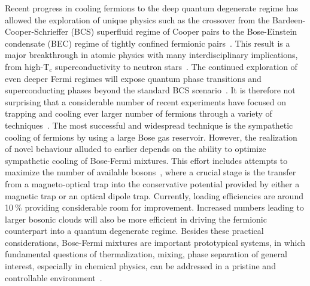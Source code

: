 \documentclass[pra,letterpaper,onecolumn,superscriptaddress,floatfix]{revtex4}
\begin{document}
Recent progress in cooling fermions to the deep quantum degenerate regime has allowed the 
exploration of unique physics such as the crossover from the Bardeen-Cooper-Schrieffer  (BCS) superfluid regime of 
Cooper pairs to the Bose-Einstein condensate (BEC) regime of tightly confined fermionic pairs~\cite{Zwierlein,Ketterlerev}. 
This result is a major breakthrough in atomic physics with many interdisciplinary implications, from high-T${}_c$ 
superconductivity to neutron stars~\cite{Chen,Giorgini,Ayryan}. 
The continued exploration of even deeper Fermi regimes  will expose quantum phase transitions and superconducting 
phases beyond the standard BCS scenario~\cite{McKayrev,Onofriorev}. It is therefore not surprising that 
a considerable number of recent experiments have focused on trapping and cooling ever larger number of fermions through 
a variety of techniques~\cite{Duarte,McKay,Burchianti,Gross}. The most successful and widespread technique is
the sympathetic cooling of fermions by using a large Bose gas reservoir. However, the realization of novel behaviour alluded
to earlier depends on the ability to optimize sympathetic cooling of Bose-Fermi mixtures.  This effort includes attempts 
to maximize the number of available bosons~\cite{Chaudhuri,Shibata}, where a crucial stage is the transfer from
a magneto-optical trap into the conservative potential provided by either a magnetic trap or an optical dipole trap. 
Currently, loading efficiencies are around 10$~\%$ providing considerable room for improvement. 
Increased numbers leading to larger bosonic clouds will also be more efficient in driving 
the fermionic counterpart into a quantum degenerate regime. Besides these practical considerations, 
Bose-Fermi mixtures are important prototypical systems, in which fundamental questions of 
thermalization, mixing, phase separation of general interest, especially in chemical physics, 
can be addressed in a pristine and controllable environment~\cite{Ufrecht}.
\end{document}
